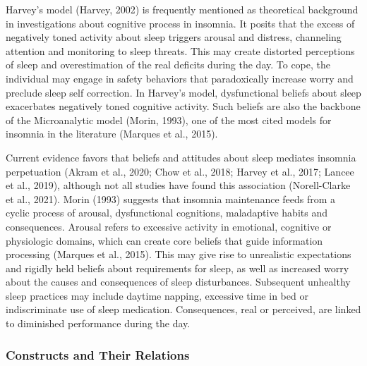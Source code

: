 \documentclass[
  ,doc,11pt, twoside,floatsintext]{apa6}
\begin{document}
Harvey's model (Harvey, 2002) is frequently mentioned as theoretical background in investigations about cognitive process in insomnia. It posits that the excess of negatively toned activity about sleep triggers arousal and distress, channeling attention and monitoring to sleep threats. This may create distorted perceptions of sleep and overestimation of the real deficits during the day. To cope, the individual may engage in safety behaviors that paradoxically increase worry and preclude sleep self correction. In Harvey's model, dysfunctional beliefs about sleep exacerbates negatively toned cognitive activity. Such beliefs are also the backbone of the Microanalytic model (Morin, 1993), one of the most cited models for insomnia in the literature (Marques et al., 2015).

Current evidence favors that beliefs and attitudes about sleep mediates insomnia perpetuation (Akram et al., 2020; Chow et al., 2018; Harvey et al., 2017; Lancee et al., 2019), although not all studies have found this association (Norell-Clarke et al., 2021). Morin (1993) suggests that insomnia maintenance feeds from a cyclic process of arousal, dysfunctional cognitions, maladaptive habits and consequences. Arousal refers to excessive activity in emotional, cognitive or physiologic domains, which can create core beliefs that guide information processing (Marques et al., 2015). This may give rise to unrealistic expectations and rigidly held beliefs about requirements for sleep, as well as increased worry about the causes and consequences of sleep disturbances. Subsequent unhealthy sleep practices may include daytime napping, excessive time in bed or indiscriminate use of sleep medication. Consequences, real or perceived, are linked to diminished performance during the day.

\hypertarget{constructs-and-their-relations}{%
\subsubsection{Constructs and Their Relations}\label{constructs-and-their-relations}}
\end{document}
